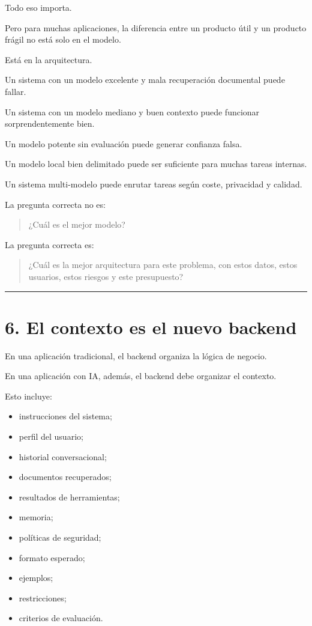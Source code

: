 Todo eso importa.

Pero para muchas aplicaciones, la diferencia entre un producto útil y un
producto frágil no está solo en el modelo.

Está en la arquitectura.

Un sistema con un modelo excelente y mala recuperación documental puede
fallar.

Un sistema con un modelo mediano y buen contexto puede funcionar
sorprendentemente bien.

Un modelo potente sin evaluación puede generar confianza falsa.

Un modelo local bien delimitado puede ser suficiente para muchas tareas
internas.

Un sistema multi-modelo puede enrutar tareas según coste, privacidad y
calidad.

La pregunta correcta no es:

\begin{quote}
¿Cuál es el mejor modelo?
\end{quote}

La pregunta correcta es:

\begin{quote}
¿Cuál es la mejor arquitectura para este problema, con estos datos,
estos usuarios, estos riesgos y este presupuesto?
\end{quote}

\begin{center}\rule{0.5\linewidth}{0.5pt}\end{center}

\section{6. El contexto es el nuevo
backend}\label{el-contexto-es-el-nuevo-backend}

En una aplicación tradicional, el backend organiza la lógica de negocio.

En una aplicación con IA, además, el backend debe organizar el contexto.

Esto incluye:

\begin{itemize}
\tightlist
\item
  instrucciones del sistema;
\item
  perfil del usuario;
\item
  historial conversacional;
\item
  documentos recuperados;
\item
  resultados de herramientas;
\item
  memoria;
\item
  políticas de seguridad;
\item
  formato esperado;
\item
  ejemplos;
\item
  restricciones;
\item
  criterios de evaluación.
\end{itemize}

